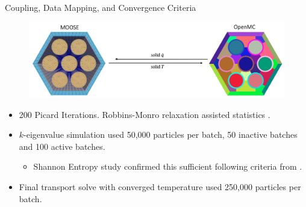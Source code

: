 \documentclass[9pt,t]{beamer}
\begin{document}
\begin{frame}{Coupling, Data Mapping, and Convergence Criteria}
    \begin{figure}[T]
        \centering
        \includegraphics[width=\linewidth]{figures/cardinal_solid.png}
    \end{figure}
    \begin{itemize}
        \item 200 Picard Iterations. Robbins-Monro relaxation assisted statistics \cite{dufek}.
        \item $k$-eigenvalue simulation used 50,000 particles per batch, 50 inactive batches and 100 active batches.
        \begin{itemize}
            \item Shannon Entropy study confirmed this sufficient following criteria from \cite{brown-entropy-2006}.
        \end{itemize}
        \item Final transport solve with converged temperature used 250,000 particles per batch.
    \end{itemize}
\end{frame}


\end{document}
